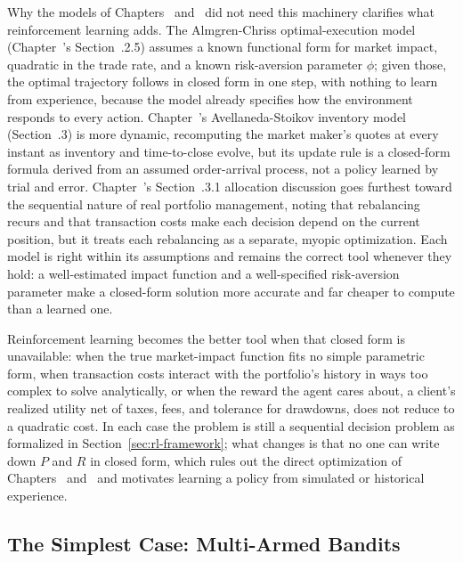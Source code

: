 \documentclass[../ai_in_finance]{subfiles}
\begin{document}
Why the models of Chapters~ and~ did not need this machinery clarifies what reinforcement learning adds. The Almgren-Chriss optimal-execution model (Chapter~'s Section~.2.5) assumes a known functional form for market impact, quadratic in the trade rate, and a known risk-aversion parameter $\phi$; given those, the optimal trajectory follows in closed form in one step, with nothing to learn from experience, because the model already specifies how the environment responds to every action. Chapter~'s Avellaneda-Stoikov inventory model (Section~.3) is more dynamic, recomputing the market maker's quotes at every instant as inventory and time-to-close evolve, but its update rule is a closed-form formula derived from an assumed order-arrival process, not a policy learned by trial and error. Chapter~'s Section~.3.1 allocation discussion goes furthest toward the sequential nature of real portfolio management, noting that rebalancing recurs and that transaction costs make each decision depend on the current position, but it treats each rebalancing as a separate, myopic optimization. Each model is right within its assumptions and remains the correct tool whenever they hold: a well-estimated impact function and a well-specified risk-aversion parameter make a closed-form solution more accurate and far cheaper to compute than a learned one.

Reinforcement learning becomes the better tool when that closed form is unavailable: when the true market-impact function fits no simple parametric form, when transaction costs interact with the portfolio's history in ways too complex to solve analytically, or when the reward the agent cares about, a client's realized utility net of taxes, fees, and tolerance for drawdowns, does not reduce to a quadratic cost. In each case the problem is still a sequential decision problem as formalized in Section~\ref{sec:rl-framework}; what changes is that no one can write down $P$ and $R$ in closed form, which rules out the direct optimization of Chapters~ and~ and motivates learning a policy from simulated or historical experience.

\subsection{The Simplest Case: Multi-Armed Bandits}
\label{sec:rl-bandit}
\end{document}
